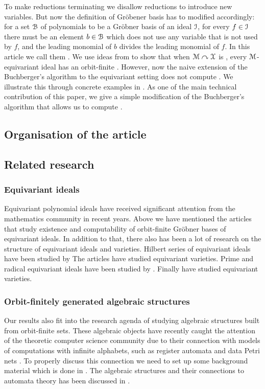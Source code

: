 To make reductions terminating we disallow reductions to introduce new variables.
But now the definition of Gr\"{o}bener basis has to modified accordingly:
for a set $\Basis$ of polynomials to be a Gr\"{o}bner basis of an ideal $\idl[I]$,
for every $f\in\idl[I]$ there must be an element $b\in\Basis$ which does not use any variable that is not used by $f$,
and the leading monomial of $b$ divides the leading monomial of $f$.
In this article we call them .
We use ideas from \cite{GHOLAS24} to show that when $\mathcal{M}\curvearrowright\mathcal{X}$ is ,
every $\mathcal{M}$-equivariant ideal has an orbit-finite .
However, now the naive extension of the Buchberger's algorithm to the equivariant setting does not compute .
We illustrate this through concrete examples in .
As one of the main technical contribution of this paper,
we give a simple modification of the Buchberger's algorithm that allows us to compute .
%
\subsection{Organisation of the article}
%
\subsection{Related research}
%
\subsubsection{Equivariant ideals}
%
Equivariant polynomial ideals have received significant attention from the mathematics community in recent years. 
Above we have mentioned the articles that study existence and computability of orbit-finite Gr\"{o}bner bases of equivariant ideals.
In addition to that,
there also has been a lot of research on the structure of equivariant ideals and varieties.
Hilbert series of equivariant ideals have been studied by \cite{NaRo17,KrLeSn17,MaNa21,Na21}
The articles \cite{DEKL15,NaSn20} have studied equivariant varieties.
Prime and radical equivariant ideals have been studied by \cite{NaSn21,KuRi25,Sn24}.
Finally \cite{SaSn16,SaSn19,Yu25,NSY25} have studied equivariant varieties.
%
\subsubsection{Orbit-finitely generated algebraic structures}
%
Our results also fit into the research agenda of studying algebraic structures built from orbit-finite sets.
These algebraic objects have recently caught the attention of the theoretic computer science community due to their connection with models of computations with infinite alphabets,
such as register automata and data Petri nets
\cite{Boj13,BoSt20,Ste24,BFKM24,YBK26,GHL22,GHL25,Gho25,ramsey}.
To properly discuss this connection we need to set up some background material which is done in .
The algebraic structures and their connections to automata theory has been discussed in .
%
